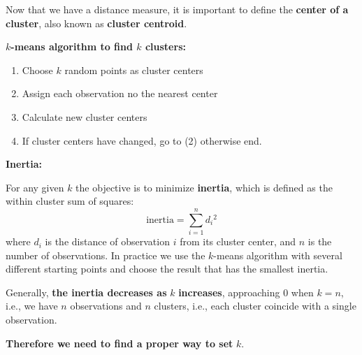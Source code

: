Now that we have a distance measure, it is important to define the \textbf{center of a cluster}, also known as \textbf{cluster centroid}.

\textbf{$k$-means algorithm to find $k$ clusters:}
\begin{enumerate}
    \item Choose $k$ random points as cluster centers
    \item Assign each observation no the nearest center
    \item Calculate new cluster centers
    \item If cluster centers have changed, go to (2) otherwise end.
\end{enumerate}

\textbf{Inertia:}

For any given $k$ the objective is to minimize \textbf{inertia}, which is defined as the within cluster sum of squares:
\begin{equation*}
    \text{inertia} =\sum _{i=1}^{n} d{_{i}}^{2}
\end{equation*}
where $d_{i}$ is the distance of observation $i$ from its cluster center, and $n$ is the number of observations. In practice we use the $k$-means algorithm with several different starting points and choose the result that has the smallest inertia.

Generally, \textbf{the inertia decreases as }$k$\textbf{ increases}, approaching $0$ when $k=n$, i.e., we have $n$ observations and $n$ clusters, i.e., each cluster coincide with a single observation.

\textbf{Therefore we need to find a proper way to set }$k$.

